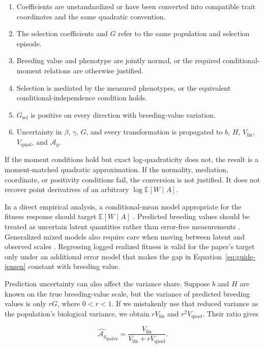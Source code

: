 \documentclass[11pt]{article}
\newcommand{\E}{\mathbb{E}}
\newcommand{\Ag}{\ensuremath{\mathcal A_g}}
\newcommand{\Vlin}{\ensuremath{V_{\mathrm{lin}}}}
\newcommand{\Vquad}{\ensuremath{V_{\mathrm{quad}}}}
\begin{document}
\begin{enumerate}
\item Coefficients are unstandardized or have been converted into compatible
trait coordinates and the same quadratic convention.
\item The selection coefficients and $G$ refer to the same population and
selection episode.
\item Breeding value and phenotype are jointly normal, or the required
conditional-moment relations are otherwise justified.
\item Selection is mediated by the measured phenotypes, or the equivalent
conditional-independence condition holds.
\item $G_{\mathrm{sel}}$ is positive on every direction with breeding-value
variation.
\item Uncertainty in $\beta$, $\gamma$, $G$, and every transformation is
propagated to $b$, $H$, $\Vlin$, $\Vquad$, and \Ag.
\end{enumerate}

If the moment conditions hold but exact log-quadraticity does not, the result
is a moment-matched quadratic approximation.  If the normality, mediation,
coordinate, or positivity conditions fail, the conversion is not justified.
It does not recover point derivatives of an arbitrary
$\log\E[W\mid A]$.

In a direct empirical analysis, a conditional-mean model appropriate for the
fitness response should target $\E[W\mid A]$ \citep{MorrisseyGoudie2022}.
Predicted breeding values
should be treated as uncertain latent quantities rather than error-free
measurements \citep{HadfieldEtAl2010}.  Generalized mixed models also require
care when moving between latent and observed scales \citep{deVillemereuilEtAl2016}.
Regressing logged realized fitness is valid for the paper's
target only under an additional error model that makes the gap in
Equation~\eqref{eq:guide-jensen} constant with breeding value.

Prediction uncertainty can also affect the variance share. Suppose $b$ and $H$ are known on the true breeding-value scale, but the variance of predicted breeding values is only $rG$, where $0<r<1$. If we mistakenly use that reduced variance as the population's biological variance, we obtain $r\Vlin$ and $r^2\Vquad$. Their ratio gives

\begin{equation}
\widehat{\Ag}_{\mathrm{naive}}
=\frac{\Vlin}{\Vlin+r\Vquad}.
\label{eq:guide-ebv}
\end{equation}
\end{document}
